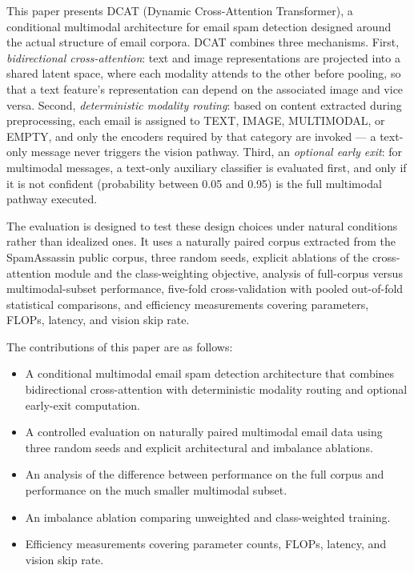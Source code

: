 \documentclass[10pt,twoside]{article}
\begin{document}
This paper presents DCAT (Dynamic Cross-Attention Transformer), a conditional multimodal architecture for email spam detection designed around the actual structure of email corpora. DCAT combines three mechanisms. First, \emph{bidirectional cross-attention}: text and image representations are projected into a shared latent space, where each modality attends to the other before pooling, so that a text feature's representation can depend on the associated image and vice versa. Second, \emph{deterministic modality routing}: based on content extracted during preprocessing, each email is assigned to TEXT, IMAGE, MULTIMODAL, or EMPTY, and only the encoders required by that category are invoked --- a text-only message never triggers the vision pathway. Third, an \emph{optional early exit}: for multimodal messages, a text-only auxiliary classifier is evaluated first, and only if it is not confident (probability between 0.05 and 0.95) is the full multimodal pathway executed.

The evaluation is designed to test these design choices under natural conditions rather than idealized ones. It uses a naturally paired corpus extracted from the SpamAssassin public corpus, three random seeds, explicit ablations of the cross-attention module and the class-weighting objective, analysis of full-corpus versus multimodal-subset performance, five-fold cross-validation with pooled out-of-fold statistical comparisons, and efficiency measurements covering parameters, FLOPs, latency, and vision skip rate.

The contributions of this paper are as follows:
\begin{itemize}
\item A conditional multimodal email spam detection architecture that combines bidirectional cross-attention with deterministic modality routing and optional early-exit computation.
\item A controlled evaluation on naturally paired multimodal email data using three random seeds and explicit architectural and imbalance ablations.
\item An analysis of the difference between performance on the full corpus and performance on the much smaller multimodal subset.
\item An imbalance ablation comparing unweighted and class-weighted training.
\item Efficiency measurements covering parameter counts, FLOPs, latency, and vision skip rate.
\end{itemize}
\end{document}
